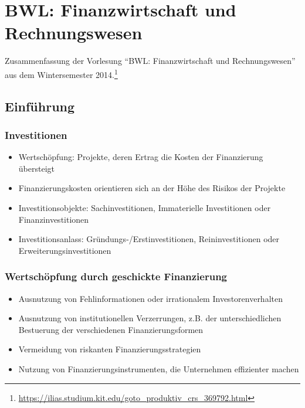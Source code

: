 \chapter{BWL: Finanzwirtschaft und Rechnungswesen}

Zusammenfassung der Vorlesung "`BWL: Finanzwirtschaft und Rechnungswesen"' aus dem Wintersemester 2014.\footnote{\url{https://ilias.studium.kit.edu/goto_produktiv_crs_369792.html}}



\section{Einführung}

\subsection{Investitionen}
\begin{itemize}
	\item Wertschöpfung: Projekte, deren Ertrag die Kosten der Finanzierung übersteigt
	\item Finanzierungskosten orientieren sich an der Höhe des Risikos der Projekte
	\item Investitionsobjekte: Sachinvestitionen, Immaterielle Investitionen oder Finanzinvestitionen
	\item Investitionsanlass: Gründungs-/Erstinvestitionen, Reininvestitionen oder Erweiterungsinvestitionen
\end{itemize}


\subsection{Wertschöpfung durch geschickte Finanzierung}
\begin{itemize}
	\item Ausnutzung von Fehlinformationen oder irrationalem Investorenverhalten
	\item Ausnutzung von institutionellen Verzerrungen, z.B. der unterschiedlichen Bestuerung der verschiedenen Finanzierungsformen
	\item Vermeidung von riskanten Finanzierungsstrategien
	\item Nutzung von Finanzierungsinstrumenten, die Unternehmen effizienter machen
\end{itemize}


